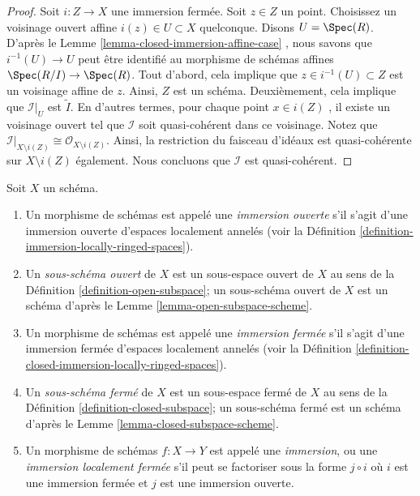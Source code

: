 \begin{proof}
Soit  $i : Z \to X$  une immersion fermée. Soit  $z \in Z$  un point. Choisissez un
voisinage ouvert affine  $i(z) \in U \subset X$ quelconque. Disons  $U = \Spec(R)$. D'après le
Lemme  \ref{lemma-closed-immersion-affine-case} , nous savons que  $i^{-1}(U) \to U$  peut être identifié au morphisme
de schémas affines  $\Spec(R/I) \to \Spec(R)$. Tout d'abord, cela implique que  $z \in i^{-1}(U) \subset Z$  est
un voisinage affine de  $z$. Ainsi,  $Z$  est un schéma.
Deuxièmement, cela implique que  $\mathcal{I}|_U$  est  $\widetilde I$. En d'autres termes,
pour chaque point  $x \in i(Z)$ , il existe un voisinage ouvert tel que  $\mathcal{I}$ 
soit quasi-cohérent dans ce voisinage. Notez que  $\mathcal{I}|_{X \setminus i(Z)}
\cong \mathcal{O}_{X \setminus i(Z)}$. Ainsi, la
restriction du faisceau d'idéaux est quasi-cohérente sur  $X \setminus i(Z)$  également.
Nous concluons que  $\mathcal{I}$  est quasi-cohérent.
\end{proof}

\begin{definition}
\label{definition-immersion}
Soit  $X$  un schéma.
\begin{enumerate}
\item Un morphisme de schémas est appelé une  {\it  immersion
ouverte}  s'il s'agit d'une immersion ouverte d'espaces localement
annelés (voir la Définition  \ref{definition-immersion-locally-ringed-spaces}).
\item Un  {\it  sous-schéma ouvert}  de  $X$  est un
sous-espace ouvert de  $X$  au sens de la Définition  \ref{definition-open-subspace}; un
sous-schéma ouvert de  $X$  est un schéma d'après le Lemme  \ref{lemma-open-subspace-scheme}.
\item Un morphisme de schémas est appelé une  {\it  immersion
fermée}  s'il s'agit d'une immersion fermée d'espaces localement annelés
(voir la Définition  \ref{definition-closed-immersion-locally-ringed-spaces}).
\item Un  {\it  sous-schéma fermé}  de  $X$  est un
sous-espace fermé de  $X$  au sens de la Définition  \ref{definition-closed-subspace}; un
sous-schéma fermé est un schéma d'après le Lemme  \ref{lemma-closed-subspace-scheme}.
\item Un morphisme de schémas $f : X \to Y$  est appelé une
 {\it immersion}, ou une
 {\it immersion localement fermée} s'il peut se
factoriser sous la forme $j \circ i$ où $i$  est une immersion fermée et
 $j$ est une immersion ouverte.
\end{enumerate}
\end{definition}

